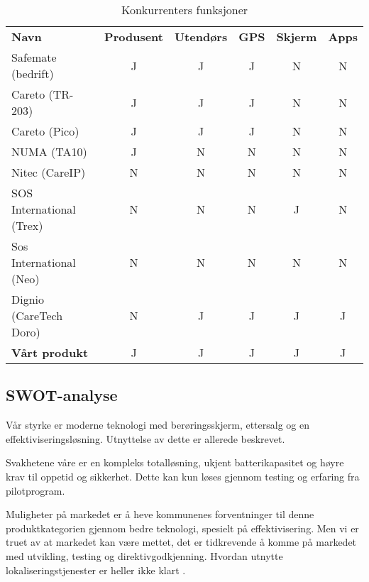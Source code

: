 \begin{table}
  \centering
  \begin{tabular}{lccccc}
    \textbf{Navn} &
    \textbf{Produsent} &
    \textbf{Utendørs} &
    \textbf{GPS} &
    \textbf{Skjerm} &
    \textbf{Apps} \\

    Safemate (bedrift) & J & J  & J  & N  & N \\
    Careto (TR-203)    & J & J  & J  & N  & N \\
    Careto (Pico)      & J & J  & J  & N  & N \\
    NUMA (TA10)        & J & N  & N  & N  & N \\
    Nitec (CareIP)     & N & N  & N  & N  & N \\
    SOS International
    (Trex)             & N & N  & N  & J  & N \\
    Sos International
    (Neo)              & N & N  & N  & N  & N \\
    Dignio
    (CareTech Doro)    & N & J  & J  & J  & J \\
    \textbf{Vårt produkt}
                       & J & J  & J  & J  & J \\
  \end{tabular}
  \caption{Konkurrenters funksjoner}
  \label{table.konkurranse.funksjoner}
\end{table}

\subsection{SWOT-analyse}

Vår styrke er moderne teknologi med berøringsskjerm, ettersalg og en
effektiviseringsløsning. Utnyttelse av dette er allerede beskrevet.

Svakhetene våre er en kompleks totalløsning, ukjent batterikapasitet og høyre
krav til oppetid og sikkerhet. Dette kan kun løses gjennom testing og erfaring
fra pilotprogram.

Muligheter på markedet er å heve kommunenes forventninger til denne
produktkategorien gjennom bedre teknologi, spesielt på effektivisering. Men vi
er truet av at markedet kan være mettet, det er tidkrevende å komme på markedet
med utvikling, testing og direktivgodkjenning. Hvordan utnytte
lokaliseringstjenester er heller ikke klart \cite{sintef.trygge.spor}.


